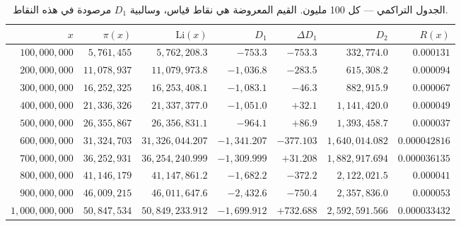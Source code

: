 \documentclass[12pt,a4paper]{article}
\begin{document}
\begin{table}[H]
\centering\small
\begin{tabular}{rrrrrrr}
\toprule
$x$ & $\pi(x)$ & $\mathrm{Li}(x)$ & $D_1$ & $\Delta D_1$ & $D_2$ & $R(x)$ \\
\midrule
$100{,}000{,}000$ & $5{,}761{,}455$ & $5{,}762{,}208.3$ & $-753.3$ & $-753.3$ & $332{,}774.0$ & $0.000131$ \\
$200{,}000{,}000$ & $11{,}078{,}937$ & $11{,}079{,}973.8$ & $-1{,}036.8$ & $-283.5$ & $615{,}308.2$ & $0.000094$ \\
$300{,}000{,}000$ & $16{,}252{,}325$ & $16{,}253{,}408.1$ & $-1{,}083.1$ & $-46.3$ & $882{,}915.9$ & $0.000067$ \\
$400{,}000{,}000$ & $21{,}336{,}326$ & $21{,}337{,}377.0$ & $-1{,}051.0$ & $+32.1$ & $1{,}141{,}420.0$ & $0.000049$ \\
$500{,}000{,}000$ & $26{,}355{,}867$ & $26{,}356{,}831.1$ & $-964.1$ & $+86.9$ & $1{,}393{,}458.7$ & $0.000037$ \\
$600{,}000{,}000$ & $31{,}324{,}703$ & $31{,}326{,}044.207$ & $-1{,}341.207$ & $-377.103$ & $1{,}640{,}014.082$ & $0.000042816$ \\
$700{,}000{,}000$ & $36{,}252{,}931$ & $36{,}254{,}240.999$ & $-1{,}309.999$ & $+31.208$ & $1{,}882{,}917.694$ & $0.000036135$ \\
$800{,}000{,}000$ & $41{,}146{,}179$ & $41{,}147{,}861.2$ & $-1{,}682.2$ & $-372.2$ & $2{,}122{,}021.5$ & $0.000041$ \\
$900{,}000{,}000$ & $46{,}009{,}215$ & $46{,}011{,}647.6$ & $-2{,}432.6$ & $-750.4$ & $2{,}357{,}836.0$ & $0.000053$ \\
$1{,}000{,}000{,}000$ & $50{,}847{,}534$ & $50{,}849{,}233.912$ & $-1{,}699.912$ & $+732.688$ & $2{,}592{,}591.566$ & $0.000033432$ \\
\bottomrule
\end{tabular}
\caption{الجدول التراكمي — كل 100 مليون. القيم المعروضة هي نقاط قياس، وسالبية $D_1$ مرصودة في هذه النقاط.}
\end{table}
\end{document}
